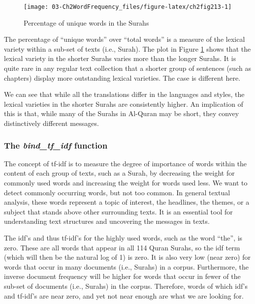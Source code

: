 \documentclass[
]{article}
\begin{document}
\begin{figure}

{\centering \texttt{[image: 03-Ch2WordFrequency\_files/figure-latex/ch2fig213-1]} 

}

\caption{Percentage of unique words in the Surahs}\label{fig:ch2fig213}
\end{figure}

The percentage of ``unique words'' over ``total words'' is a measure of the lexical variety within a sub-set of texts (i.e., Surah). The plot in Figure \ref{fig:ch2fig213} shows that the lexical variety in the shorter Surahs varies more than the longer Surahs. It is quite rare in any regular text collection that a shorter group of sentences (such as chapters) display more outstanding lexical varieties. The case is different here.

We can see that while all the translations differ in the languages and styles, the lexical varieties in the shorter Surahs are consistently higher. An implication of this is that, while many of the Surahs in Al-Quran may be short, they convey distinctively different messages.

\hypertarget{the-bind_tf_idf-function}{%
\subsubsection{\texorpdfstring{The \emph{bind\_tf\_idf} function}{The bind\_tf\_idf function}}\label{the-bind_tf_idf-function}}

The concept of tf-idf is to measure the degree of importance of words within the content of each group of texts, such as a Surah, by decreasing the weight for commonly used words and increasing the weight for words used less. We want to detect commonly occurring words, but not too common. In general textual analysis, these words represent a topic of interest, the headlines, the themes, or a subject that stands above other surrounding texts. It is an essential tool for understanding text structures and uncovering the messages in texts.

The idf's and thus tf-idf's for the highly used words, such as the word ``the'', is zero. These are all words that appear in all 114 Quran Surahs, so the idf term (which will then be the natural log of 1) is zero. It is also very low (near zero) for words that occur in many documents (i.e., Surahs) in a corpus. Furthermore, the inverse document frequency will be higher for words that occur in fewer of the sub-set of documents (i.e., Surahs) in the corpus. Therefore, words of which idf's and tf-idf's are near zero, and yet not near enough are what we are looking for.
\end{document}
